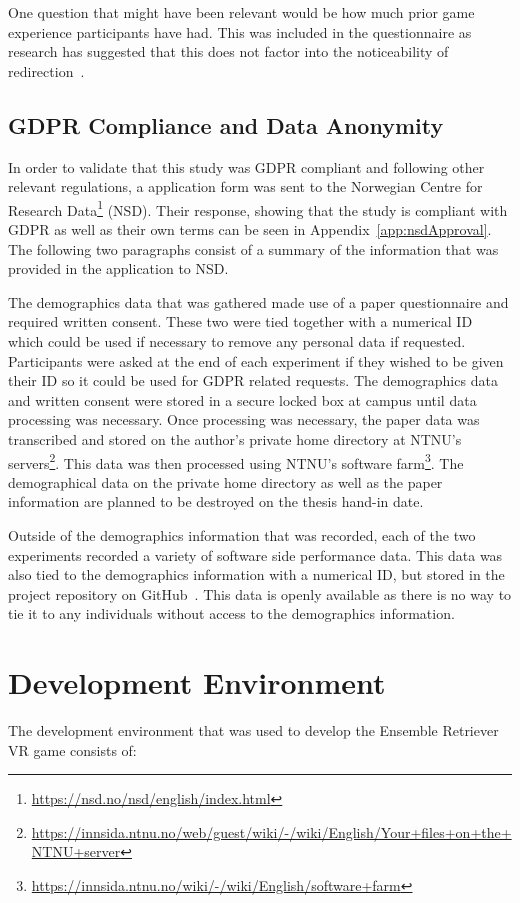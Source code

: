 One question that might have been relevant would be how much prior game experience participants have had. This was included in the questionnaire as research has suggested that this does not factor into the noticeability of redirection~\cite{nguyen2018individual}.

\subsection{GDPR Compliance and Data Anonymity}
In order to validate that this study was GDPR compliant and following other relevant regulations, a application form was sent to the Norwegian Centre for Research Data\footnote{\url{https://nsd.no/nsd/english/index.html}} (NSD). Their response, showing that the study is compliant with GDPR as well as their own terms can be seen in Appendix~\ref{app:nsdApproval}. The following two paragraphs consist of a summary of the information that was provided in the application to NSD.

The demographics data that was gathered made use of a paper questionnaire and required written consent. These two were tied together with a numerical ID which could be used if necessary to remove any personal data if requested. Participants were asked at the end of each experiment if they wished to be given their ID so it could be used for GDPR related requests. The demographics data and written consent were stored in a secure locked box at campus until data processing was necessary. Once processing was necessary, the paper data was transcribed and stored on the author's private home directory at NTNU's servers\footnote{\url{https://innsida.ntnu.no/web/guest/wiki/-/wiki/English/Your+files+on+the+NTNU+server}}. This data was then processed using NTNU's software farm\footnote{\url{https://innsida.ntnu.no/wiki/-/wiki/English/software+farm}}. The demographical data on the private home directory as well as the paper information are planned to be destroyed on the thesis hand-in date.

Outside of the demographics information that was recorded, each of the two experiments recorded a variety of software side performance data. This data was also tied to the demographics information with a numerical ID, but stored in the project repository on GitHub~\cite{projectRepository}. This data is openly available as there is no way to tie it to any individuals without access to the demographics information.

\section{Development Environment}
The development environment that was used to develop the Ensemble Retriever VR game consists of: 


